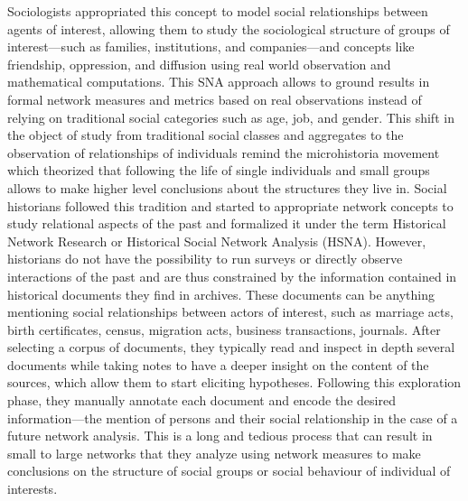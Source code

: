 Sociologists appropriated this concept to model social relationships between agents of interest, allowing them to study the sociological structure of groups of interest---such as families, institutions, and companies---and concepts like friendship, oppression, and diffusion using real world observation and mathematical computations.
This SNA approach allows to ground results in formal network measures and metrics based on real observations instead of relying on traditional social categories such as age, job, and gender\cite{freemanDevelopmentSocialNetwork2004}.
This shift in the object of study from traditional social classes and aggregates to the observation of relationships of individuals remind the microhistoria movement \cite{ginzburgMicrohistoire1981} which theorized that following the life of single individuals and small groups allows to make higher level conclusions about the structures they live in.
Social historians followed this tradition and started to appropriate network concepts to study relational aspects of the past and formalized it under the term Historical Network Research or Historical Social Network Analysis (HSNA)\cite{wetherellHistoricalSocialNetwork1998}.
However, historians do not have the possibility to run surveys or directly observe interactions of the past and are thus constrained by the information contained in historical documents they find in archives.
These documents can be anything mentioning social relationships between actors of interest, such as marriage acts, birth certificates, census, migration acts, business transactions, journals.
After selecting a corpus of documents, they typically read and inspect in depth several documents while taking notes to have a deeper insight on the content of the sources, which allow them to start eliciting hypotheses.
Following this exploration phase, they manually annotate each document and encode the desired information---the mention of persons and their social relationship in the case of a future network analysis.
This is a long and tedious process that can result in small to large networks that they analyze using network measures to make conclusions on the structure of social groups or social behaviour of individual of interests.


